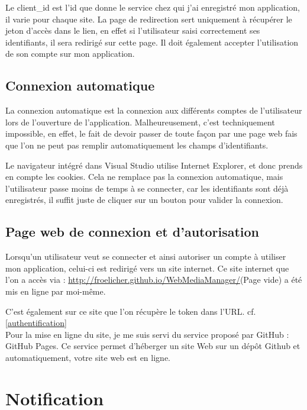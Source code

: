 \documentclass[11pt]{report} %
\begin{document}
	Le client\_id est l'id que donne le service chez qui j'ai enregistré mon application, il varie pour chaque site. 
	La page de redirection sert uniquement à récupérer le jeton d'accès dans le lien, en effet si l'utilisateur saisi correctement ses identifiants, il sera redirigé sur cette page. Il doit également accepter l'utilisation de son compte sur mon application.

	\subsection{Connexion automatique}
	La connexion automatique est la connexion aux différents comptes de l'utilisateur lors de l'ouverture de l'application. Malheureusement, c'est techniquement impossible, en effet, le fait de devoir passer de toute façon par une page web fais que l'on ne peut pas remplir automatiquement les champs d'identifiants.
	
	Le navigateur intégré dans Visual Studio utilise Internet Explorer, et donc prends en compte les cookies. Cela ne remplace pas la connexion automatique, mais l'utilisateur passe moins de temps à se connecter, car les identifiants sont déjà enregistrés, il suffit juste de cliquer sur un bouton pour valider la connexion.
	
	\subsection{Page web de connexion et d'autorisation}
	Lorsqu'un utilisateur veut se connecter et ainsi autoriser un compte à utiliser mon application, celui-ci est redirigé vers un site internet. Ce site internet que l'on a accès via : \url{http://froelicher.github.io/WebMediaManager/}(Page vide) a été mis en ligne par moi-même.
	
	C'est également sur ce site que l'on récupère le token dans l'URL. cf. \ref{authentification}\\
	
	Pour la mise en ligne du site, je me suis servi du service proposé par GitHub : GitHub Pages. Ce service permet d'héberger un site Web sur un dépôt Github et automatiquement, votre site web est en ligne.\\
	
	\newpage
	
	\section{Notification}
	
\end{document}
